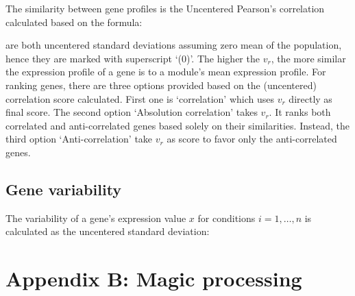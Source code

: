 The  similarity between gene profiles  is the Uncentered Pearson’s correlation calculated 
based on the formula: 

are both uncentered standard deviations assuming zero mean of the population, hence they 
are marked with superscript ‘(0)’. The higher the
$v_r$, the more similar the expression profile of a gene is to a module’s mean expression 
profile. For ranking genes, there are three options provided based on the (uncentered) correlation 
score calculated. First one is ‘correlation’ which uses $v_r$ directly as final score. The 
second option ‘Absolution correlation’ takes $v_r$. It ranks both correlated and anti-correlated 
genes based solely on their similarities. Instead, the third option ‘Anti-correlation’ take 
$v_r$ as score to favor only the anti-correlated genes.

\subsection{Gene variability}

The variability of a gene's expression value $x$ for conditions $i=1,…,n$ is calculated as the 
uncentered standard deviation: 





\section{Appendix B: Magic processing}




\cleardoublepage

